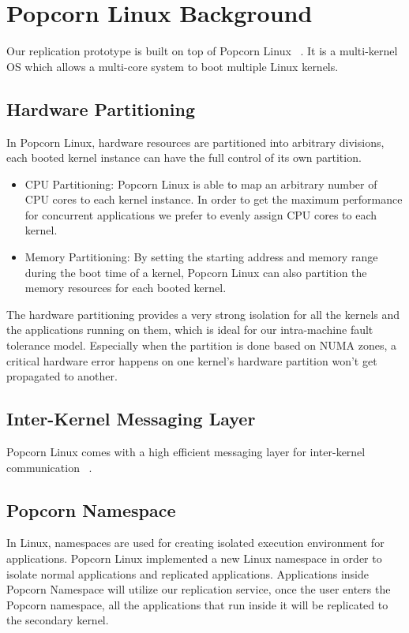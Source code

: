 \chapter{Popcorn Linux Background}
Our replication prototype is built on top of Popcorn Linux ~\cite{barbalace2014popcorn}. It is a multi-kernel OS which allows a multi-core system to boot multiple Linux kernels.
\section{Hardware Partitioning}
In Popcorn Linux, hardware resources are partitioned into arbitrary divisions, each booted kernel instance can have the full control of its own partition.

\begin{itemize}
\item{CPU Partitioning:} Popcorn Linux is able to map an arbitrary number of CPU cores to each kernel instance. In order to get the maximum performance for concurrent applications we prefer to evenly assign CPU cores to each kernel.

\item{Memory Partitioning:} By setting the starting address and memory range during the boot time of a kernel, Popcorn Linux can also partition the memory resources for each booted kernel.
\end{itemize}

The hardware partitioning provides a very strong isolation for all the kernels and the applications running on them, which is ideal for our intra-machine fault tolerance model. Especially when the partition is done based on NUMA zones, a critical hardware error happens on one kernel's hardware partition won't get propagated to another.

\section{Inter-Kernel Messaging Layer}
Popcorn Linux comes with a high efficient messaging layer for inter-kernel communication ~\cite{shelton2013popcorn}.

\section{Popcorn Namespace}
In Linux, namespaces are used for creating isolated execution environment for applications. Popcorn Linux implemented a new Linux namespace in order to isolate normal applications and replicated applications. Applications inside Popcorn Namespace will utilize our replication service, once the user enters the Popcorn namespace, all the applications that run inside it will be replicated to the secondary kernel.

